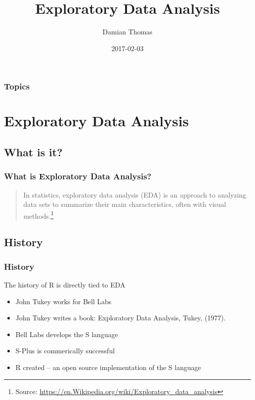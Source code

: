 \documentclass{beamer}
\title{Exploratory Data Analysis}
\author{Damian Thomas}
\date{2017-02-03}
\begin{document}


\begin{frame}
\maketitle
\end{frame}



\begin{frame}
\frametitle{Topics}
\tableofcontents
\end{frame}



\section{Exploratory Data Analysis}
\subsection{What is it?} 
\begin{frame}
\frametitle{What is Exploratory Data Analysis?} 

\begin{quote}
In statistics, exploratory data analysis (EDA) is an approach to analyzing data sets to summarize their main characteristics, often with visual methods.\footnote{Source: \url{https://en.Wikipedia.org/wiki/Exploratory_data_analysis}}
\end{quote}

\end{frame}


\subsection{History}
\begin{frame}
\frametitle{History} 

The history of R is directly tied to EDA
\begin{itemize}
\item John Tukey works for Bell Labs
\item John Tukey writes a book: Exploratory Data Analysis, Tukey, (1977).
\item Bell Labs develops the S language
\item S-Plus is commerically successful
\item R created -- an open source implementation of the S language
\end{itemize}


\end{frame}
\end{document}
